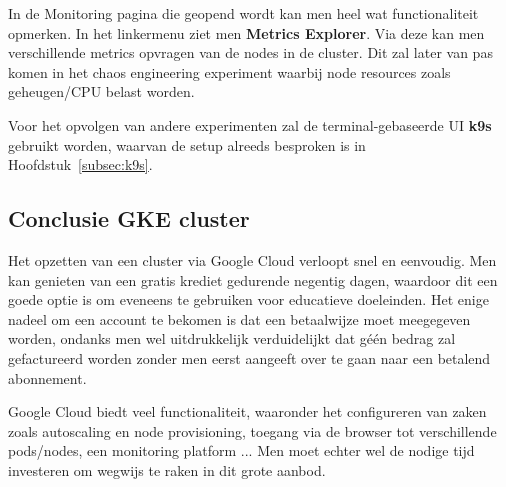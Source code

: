 In de Monitoring pagina die geopend wordt kan men heel wat functionaliteit opmerken. In het linkermenu ziet men {\bf Metrics Explorer}. Via deze kan men verschillende metrics opvragen van de nodes in de cluster. Dit zal later van pas komen in het chaos engineering experiment waarbij node resources zoals geheugen/CPU belast worden.

Voor het opvolgen van andere experimenten zal de terminal-gebaseerde UI {\bf k9s} gebruikt worden, waarvan de setup alreeds besproken is in Hoofdstuk~\ref{subsec:k9s}. 
  
\subsection{Conclusie GKE cluster}

Het opzetten van een cluster via Google Cloud verloopt snel en eenvoudig. Men kan genieten van een gratis krediet gedurende negentig dagen, waardoor dit een goede optie is om eveneens te gebruiken voor educatieve doeleinden. Het enige nadeel om een account te bekomen is dat een betaalwijze moet meegegeven worden, ondanks men wel uitdrukkelijk verduidelijkt dat géén bedrag zal gefactureerd worden zonder men eerst aangeeft over te gaan naar een betalend abonnement. 

Google Cloud biedt veel functionaliteit, waaronder het configureren van zaken zoals autoscaling en node provisioning, toegang via de browser tot verschillende pods/nodes, een monitoring platform ... Men moet echter wel de nodige tijd investeren om wegwijs te raken in dit grote aanbod.  